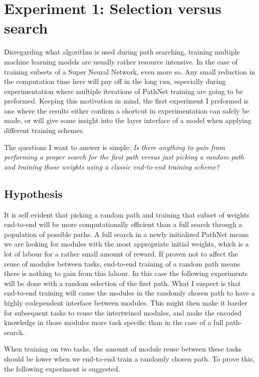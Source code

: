 \chapter{Experiment 1: Selection versus search}\label{exp2}
Disregarding what algorithm is used during path searching, training multiple machine learning models are usually rather resource intensive. In the case of training subsets of a Super Neural Network, even more so. Any small reduction in the computation time here will pay off in the long run, especially during experimentation where multiple iterations of PathNet training are going to be preformed. Keeping this motivation in mind, the first experiment I preformed is one where the results either confirm a shortcut in experimentation can safely be made, or will give some insight into the layer interface of a model when applying different training schemes.

The questions I want to answer is simple: \textit{Is there anything to gain from performing a proper search for the first path versus just picking a random path and training those weights using a classic end-to-end training scheme?}

\section{Hypothesis}
It is self evident that picking a random path and training that subset of weights end-to-end will be more computationally efficient than a full search through a population of possible paths. A full search in a newly initialized PathNet means we are looking for modules with the most appropriate initial weights, which is a lot of labour for a rather small amount of reward. If proven not to affect the reuse of modules between tasks, end-to-end training of a random path means there is nothing to gain from this labour. In this case the following experiments will be done with a random selection of the first path. 
What I suspect is that end-to-end training will cause the modules in the randomly chosen path to have a highly codependent interface between modules. This might then make it harder for subsequent tasks to reuse the intertwined modules, and make the encoded knowledge in those modules more task specific than in the case of a full path-search. 

When training on two tasks, the amount of module reuse between these tasks should be lower when we end-to-end train a randomly chosen path. To prove this, the following experiment is suggested. 

